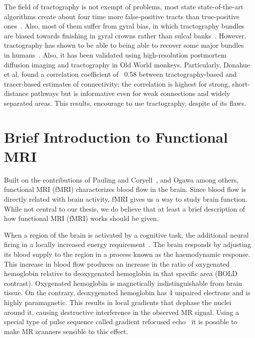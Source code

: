 The field of tractography is not exempt of problems, most state state-of-the-art
algorithms create about four time more false‐positive tracts than true‐positive
ones~\cite{Maier-hein2017}. Also, most of them suffer from gyral bias, in which tractography bundles
are biased towards finishing in gyral crowns rather than sulcal banks~\cite{VanEssen2014}.
However, tractography has shown to be able to being able to recover some major
bundles in humans~\cite{Catani2008}. Also, it has been validated using high-resolution
postmortem diffusion imaging and tractography in Old World monkeys. Particularly,
Donahue et al.\cite{Donahue2016} found a correlation
coefficient of ~0.58 between tractography-based and tracer-based estimates of
connectivity; the correlation is highest for strong, short-distance pathways
but is informative even for weak connections and widely separated areas. This
results, encourage to use tractography, despite of its flaws.

\section{Brief Introduction to Functional MRI}

Built on the contributions of Pauling and Coryell~\cite{Pauling1936}, and 
Ogawa\cite{Ogawa1990, Ogawa1993} among others, functional MRI (fMRI) characterizes
blood flow in the brain. Since blood flow is directly related with brain
activity, fMRI gives us a way to study brain function. While not central to our
thesis, we do believe that at least a brief description of how functional MRI
(fMRI) works should be given.

When a region of the brain is activated by a cognitive task, the additional
neural firing in a locally increased energy requirement~\cite{Glover2011}.
The brain responds by adjusting its blood supply to the region in a process
known as the haemodynamic response. This increase in blood flow produces an
increase in the ratio of oxygenated hemoglobin relative to deoxygenated hemoglobin
in that specific area (BOLD contrast). Oxygenated hemoglobin is magnetically 
indistinguishable from brain tissue. On the contrary, deoxygenated hemoglobin
has 4 unpaired electrons and is highly paramagnetic\cite{Glover2011}. This
results in local gradients that dephase the nuclei around it, causing destructive
interference in the observed MR signal. Using a special type of pulse sequence
called gradient refocused echo~\cite{Elster1993} it is possible to make MR
scanners sensible to this effect.


